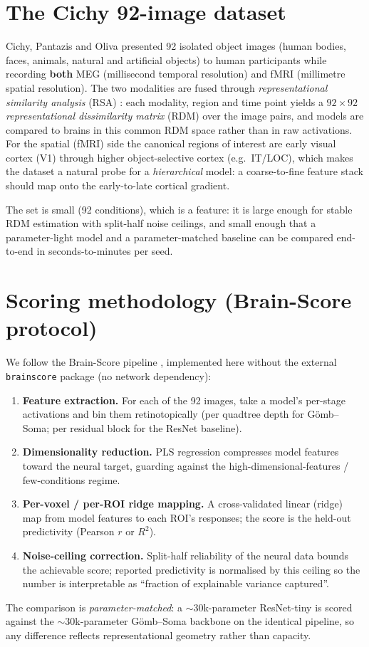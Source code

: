 \documentclass[11pt]{article}
\begin{document}
\section{The Cichy 92-image dataset}
Cichy, Pantazis and Oliva \cite{cichy2014} presented 92 isolated object images
(human bodies, faces, animals, natural and artificial objects) to human
participants while recording \textbf{both} MEG (millisecond temporal resolution)
and fMRI (millimetre spatial resolution). The two modalities are fused through
\emph{representational similarity analysis} (RSA) \cite{kriegeskorte2008}: each
modality, region and time point yields a $92\times 92$ \emph{representational
dissimilarity matrix} (RDM) over the image pairs, and models are compared to
brains in this common RDM space rather than in raw activations. For the spatial
(fMRI) side the canonical regions of interest are early visual cortex
(V1) through higher object-selective cortex (e.g.\ IT/LOC), which makes the
dataset a natural probe for a \emph{hierarchical} model: a coarse-to-fine feature
stack should map onto the early-to-late cortical gradient.

The set is small (92 conditions), which is a feature: it is large enough for
stable RDM estimation with split-half noise ceilings, and small enough that a
parameter-light model and a parameter-matched baseline can be compared
end-to-end in seconds-to-minutes per seed.

\section{Scoring methodology (Brain-Score protocol)}
We follow the Brain-Score pipeline \cite{schrimpf2018}, implemented here without
the external \texttt{brainscore} package (no network dependency):
\begin{enumerate}[nosep]
  \item \textbf{Feature extraction.} For each of the 92 images, take a model's
        per-stage activations and bin them retinotopically (per quadtree depth
        for G\"omb--Soma; per residual block for the ResNet baseline).
  \item \textbf{Dimensionality reduction.} PLS regression compresses model
        features toward the neural target, guarding against the
        high-dimensional-features / few-conditions regime.
  \item \textbf{Per-voxel / per-ROI ridge mapping.} A cross-validated linear
        (ridge) map from model features to each ROI's responses; the score is the
        held-out predictivity (Pearson $r$ or $R^2$).
  \item \textbf{Noise-ceiling correction.} Split-half reliability of the neural
        data bounds the achievable score; reported predictivity is normalised by
        this ceiling so the number is interpretable as ``fraction of explainable
        variance captured''.
\end{enumerate}
The comparison is \emph{parameter-matched}: a $\sim$30k-parameter ResNet-tiny is
scored against the $\sim$30k-parameter G\"omb--Soma backbone on the identical
pipeline, so any difference reflects representational geometry rather than
capacity.
\end{document}

